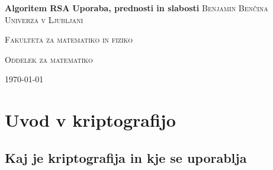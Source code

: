 \documentclass[a4paper, 12pt]{article} %
\begin{document}
\begin{titlepage}
\centering
\textbf{\Huge{Algoritem RSA}}
\vfill
\textbf{\LARGE{Uporaba, prednosti in slabosti}}
\vfill\vfill
\textsc{\Large{Benjamin Benčina}}
\vfill\vfill
\textsc{\large{Univerza v Ljubljani}}

\textsc{\large{Fakulteta za matematiko in fiziko}}

\textsc{\large{Oddelek za matematiko}}
\vfill\vfill\vfill
	
{\large\today}

\end{titlepage}

\tableofcontents
\newpage

\section{Uvod v kriptografijo}
\subsection{Kaj je kriptografija in kje se uporablja}
\end{document}
